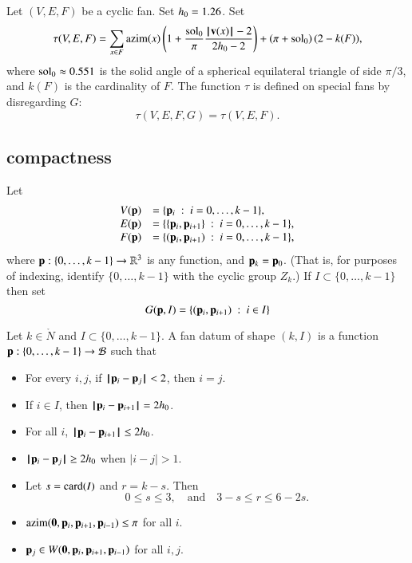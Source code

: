 \begin{definition}[$\hm$,~$\tau$]\label{def:tau}
Let $(V,E,F)$ be a cyclic fan.  Set ${h_0} = 1.26$.  Set
$$
\tau(V,E,F) =\sum_{x\in F} {\operatorname{azim}}(x)\left(1 + \frac{\displaystyle \operatorname{sol}_0}{\displaystyle \pi}  \frac{\displaystyle {{\hskip0.1em|\hskip-0.15em|\hskip0.1em}{\mathbf v}(x){\hskip0.1em|\hskip-0.15em|\hskip0.1em}}-2}{\displaystyle 2{h_0}-2}\right) + \left(\pi+{\operatorname{sol}_0}\right) (2- k(F)),
$$
where  $\operatorname{sol}_0\approx0.551$ is the solid angle of a spherical equilateral triangle of side $\pi/3$, and $k(F)$ is the cardinality of $F$.
The function $\tau$ is defined on special fans by disregarding $G$:
$$
\tau(V,E,F,G) = \tau(V,E,F).
$$
\end{definition}



\subsection{compactness}

Let 
$$
\begin{array}{lll}
V({\mathbf p}) &= \{{\mathbf p}_{i}\ :\  i=0,\ldots,k-1\},\\
E({\mathbf p}) &= \{\{{\mathbf p}_{i},{\mathbf p}_{i+1}\}\ :\  i=0,\ldots,k-1\},\\
F({\mathbf p}) &= \{({\mathbf p}_{i},{\mathbf p}_{i+1}) \ :\  i=0,\ldots,k-1\},\\
\end{array}
$$
where
 ${\mathbf p}:\{0,\ldots,k-1\}\to \mathbb{R}^3$ is any function, and
${\mathbf p}_k = {\mathbf p}_0$.  (That is, for purposes of indexing, identify $\{0,\ldots,k-1\}$ with
the cyclic group $Z_k$.)
If $I\subset\{0,\ldots,k-1\}$ then set 
$$G({\mathbf p},I) = \{({\mathbf p}_i ,{\mathbf p}_{i+1}) \ :\  i\in I\}$$

\begin{definition}  Let $k\in\ring{N}$ and $I\subset \{0,\ldots,k-1\}$.
 A fan datum of shape $(k,I)$ is a function 
${\mathbf p}:\{0,\ldots,k-1\}\to {\mathcal B}$ such that
\begin{itemize}
\item {} For every $i,j$, if ${\hskip0.1em|\hskip-0.15em|\hskip0.1em}{\mathbf p}_i - {\mathbf p}_j{\hskip0.1em|\hskip-0.15em|\hskip0.1em}<2$, then $i=j$.
\item {} If $i\in I$, then ${\hskip0.1em|\hskip-0.15em|\hskip0.1em}{\mathbf p}_i - {\mathbf p}_{i+1}{\hskip0.1em|\hskip-0.15em|\hskip0.1em}=2{h_0}$.
\item {} For all $i$, ${\hskip0.1em|\hskip-0.15em|\hskip0.1em}{\mathbf p}_i - {\mathbf p}_{i+1}{\hskip0.1em|\hskip-0.15em|\hskip0.1em} \le 2{h_0}$.
\item {}  ${\hskip0.1em|\hskip-0.15em|\hskip0.1em}{\mathbf p}_i - {\mathbf p}_j{\hskip0.1em|\hskip-0.15em|\hskip0.1em} \ge 2{h_0}$ when $|i-j|>1$.
\item {}  Let $s={\operatorname{card}}(I)$ and $r=k-s$.  Then 
$$0\le s \le 3,\quad\text{and}\quad3-s \le r \le 6 - 2s.$$
\item {} ${\operatorname{azim}}({\mathbf 0},{\mathbf p}_i,{\mathbf p}_{i+1},{\mathbf p}_{i-1})\le \pi$ for all $i$.
\item {} ${\mathbf p}_j\in W({\mathbf 0},{\mathbf p}_i,{\mathbf p}_{i+1},{\mathbf p}_{i-1})$ for all $i,j$.
\end{itemize}
\end{definition}

